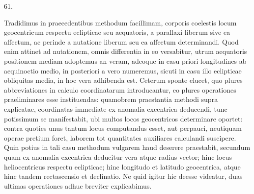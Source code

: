 \par\medskip
\hypertarget{native-080-article061}{}
\begin{center}61.\end{center}
Tradidimus in praecedentibus methodum facillimam, corporis coelestis locum geocentricum respectu eclipticae seu aequatoris, a parallaxi liberum sive ea affectum, ac perinde a nutatione liberum seu ea affectum determinandi. Quod enim attinet ad nutationem, omnis differentia in eo versabitur, utrum aequatoris positionem mediam adoptemus an veram, adeoque in casu priori longitudines ab aequinoctio medio, in posteriori a vero numeremus, sicuti in casu illo eclipticae obliquitas media, in hoc vera adhibenda est. Ceterum sponte elucet, quo plures abbreviationes in calculo coordinatarum introducantur, eo plures operationes praeliminares esse instituendas: quamobrem praestantia methodi supra explicatae, coordinatas immediate ex anomalia excentrica deducendi, tunc potissimum se manifestabit, ubi multos locos geocentricos determinare oportet: contra quoties unus tantum locus computandus esset, aut perpauci, neutiquam operae pretium foret, laborem tot quantitates auxiliares calculandi suscipere. Quin potius in tali casu methodum vulgarem haud deserere praestabit, secundum quam ex anomalia excentrica deducitur vera atque radius vector; hinc locus heliocentricus respectu eclipticae; hinc longitudo et latitudo geocentrica, atque hinc tandem rectascensio et declinatio. Ne quid igitur hic deesse videatur, duas ultimas operationes adhuc breviter explicabimus.
